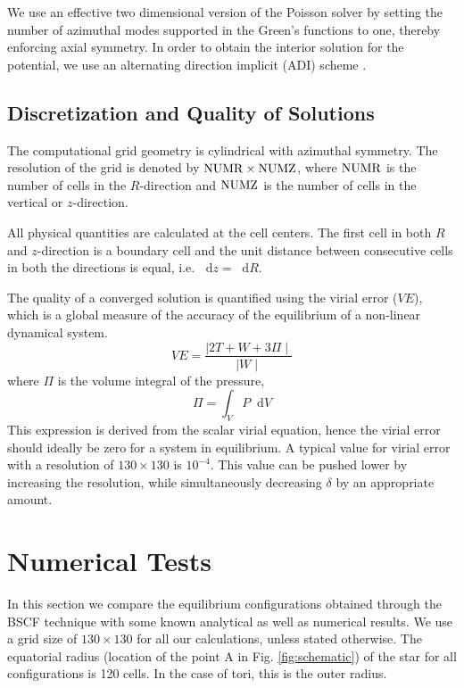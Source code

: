 \documentclass[a4paper,fleqn,usenatbib]{mnras}
\newcommand*\diff{\mathop{}\!\mathrm{d}}
\begin{document}
We use an effective two dimensional version of the Poisson solver by setting the number of azimuthal modes supported in the Green's functions to one, thereby enforcing axial symmetry. In order to obtain the interior solution for the potential, we use an alternating direction implicit (ADI) scheme  \citep{Peaceman1955}.

\subsection{Discretization and Quality of Solutions} 

The computational grid geometry is cylindrical with azimuthal symmetry. The resolution of the grid is denoted by ${\rm NUMR} \times {\rm NUMZ}$, where ${\rm NUMR}$ is the number of cells in the $R$-direction and ${\rm NUMZ}$ is the number of cells in the vertical or $z$-direction. 

All physical quantities are calculated at the cell centers. The first cell in both $R$ and $z$-direction is a boundary cell and the unit distance between consecutive cells in both the directions is equal, i.e. $\diff{z}=\diff{R}$.


The quality of a converged solution is quantified using the virial error ($VE$), which is a global measure of the accuracy of the equilibrium of a non-linear dynamical system. 
\begin{equation}
VE=\frac{ \mid 2T+W+3\Pi \mid} { \mid W \mid}
\end{equation}
where $\Pi$ is the volume integral of the pressure,
\begin{equation}
\Pi = \int_V P \diff{V}
\end{equation}
This expression is derived from the scalar virial equation, hence the  virial error should ideally be zero for a system in equilibrium. 
A typical value for virial error with a resolution of $130 \times 130$ is $10^{-4}$. This value can be pushed lower by increasing the resolution, while simultaneously decreasing $\delta$ by an appropriate amount. 


\section{Numerical Tests}
\label{NumericalTests}

In this section we compare the equilibrium configurations obtained through the BSCF technique with some known analytical as well as numerical results. We use a grid size of $130 \times 130$ for all our calculations, unless stated otherwise. The equatorial radius (location of the point A in Fig. \ref{fig:schematic}) of the star for all configurations is 120 cells. In the case of tori, this is the outer radius. 
\end{document}
